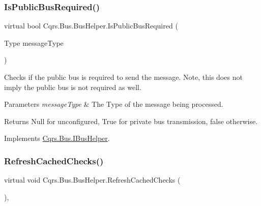 \subsubsection{\texorpdfstring{Is\+Public\+Bus\+Required()}{IsPublicBusRequired()}}
{\footnotesize\ttfamily virtual bool Cqrs.\+Bus.\+Bus\+Helper.\+Is\+Public\+Bus\+Required (\begin{DoxyParamCaption}\item[{Type}]{message\+Type }\end{DoxyParamCaption})\hspace{0.3cm}{\ttfamily [virtual]}}



Checks if the public bus is required to send the message. Note, this does not imply the public bus is not required as well. 


\begin{DoxyParams}{Parameters}
{\em message\+Type} & The Type of the message being processed.\\
\hline
\end{DoxyParams}
\begin{DoxyReturn}{Returns}
Null for unconfigured, True for private bus transmission, false otherwise.
\end{DoxyReturn}


Implements \hyperlink{interfaceCqrs_1_1Bus_1_1IBusHelper_a20c51abf04c3c0682fcb5da4c1a371ba_a20c51abf04c3c0682fcb5da4c1a371ba}{Cqrs.\+Bus.\+I\+Bus\+Helper}.

\mbox{\label{classCqrs_1_1Bus_1_1BusHelper_ad589391a51cd61673d2403ee8012e713_ad589391a51cd61673d2403ee8012e713}} 
\subsubsection{\texorpdfstring{Refresh\+Cached\+Checks()}{RefreshCachedChecks()}}
{\footnotesize\ttfamily virtual void Cqrs.\+Bus.\+Bus\+Helper.\+Refresh\+Cached\+Checks (\begin{DoxyParamCaption}{ }\end{DoxyParamCaption})\hspace{0.3cm}{\ttfamily [protected]}, {\ttfamily [virtual]}}



